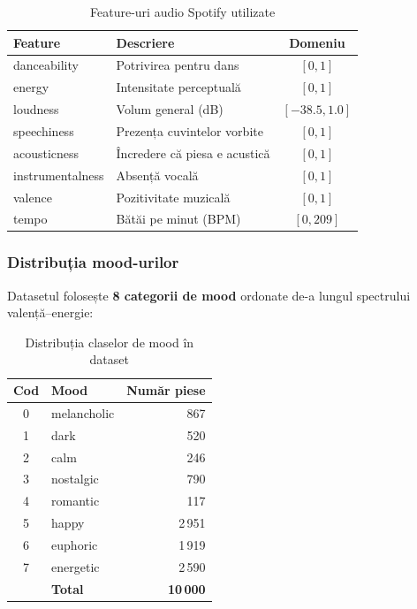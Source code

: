 \documentclass[12pt,a4paper]{article}
\begin{document}
\begin{table}[H]
\centering
\caption{Feature-uri audio Spotify utilizate}
\label{tab:features}
\begin{tabular}{llc}
\toprule
\textbf{Feature} & \textbf{Descriere} & \textbf{Domeniu} \\
\midrule
danceability      & Potrivirea pentru dans              & $[0, 1]$ \\
energy            & Intensitate perceptuală             & $[0, 1]$ \\
loudness          & Volum general (dB)                  & $[-38.5, 1.0]$ \\
speechiness       & Prezența cuvintelor vorbite         & $[0, 1]$ \\
acousticness      & Încredere că piesa e acustică       & $[0, 1]$ \\
instrumentalness  & Absență vocală                      & $[0, 1]$ \\
valence           & Pozitivitate muzicală               & $[0, 1]$ \\
tempo             & Bătăi pe minut (BPM)                & $[0, 209]$ \\
\bottomrule
\end{tabular}
\end{table}

\subsubsection{Distribuția mood-urilor}

Datasetul folosește \textbf{8 categorii de mood} ordonate de-a lungul spectrului valență--energie:

\begin{table}[H]
\centering
\caption{Distribuția claselor de mood în dataset}
\label{tab:mood_dist}
\begin{tabular}{clr}
\toprule
\textbf{Cod} & \textbf{Mood} & \textbf{Număr piese} \\
\midrule
0 & melancholic & 867 \\
1 & dark        & 520 \\
2 & calm        & 246 \\
3 & nostalgic   & 790 \\
4 & romantic    & 117 \\
5 & happy       & 2\,951 \\
6 & euphoric    & 1\,919 \\
7 & energetic   & 2\,590 \\
\midrule
  & \textbf{Total} & \textbf{10\,000} \\
\bottomrule
\end{tabular}
\end{table}
\end{document}

